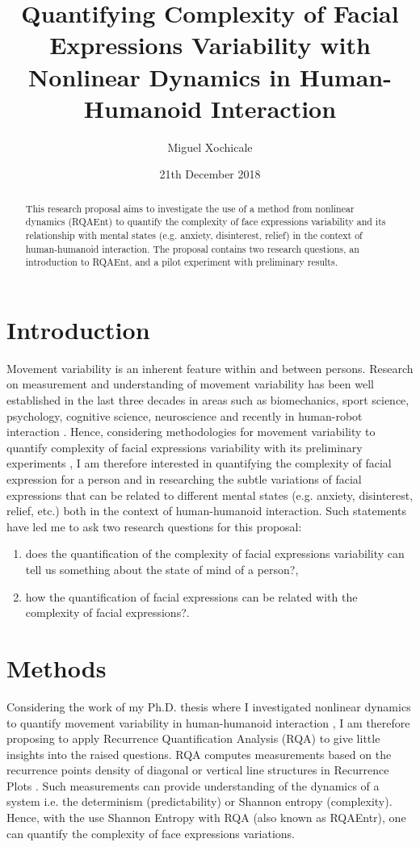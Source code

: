 \documentclass[12pt]{article}
\title{Quantifying Complexity of Facial Expressions 
Variability with Nonlinear Dynamics
in Human-Humanoid Interaction}
\author{Miguel Xochicale\\ 
}
\date{21th December 2018}
\begin{document}
\maketitle


\begin{abstract}
This research proposal aims to investigate the use of a method from nonlinear dynamics 
(RQAEnt) to quantify the complexity of face expressions variability and 
its relationship with mental states (e.g. anxiety, disinterest, relief)
in the context of human-humanoid interaction. 
The proposal contains two research questions,
an introduction to RQAEnt, and a pilot experiment with preliminary results.
\end{abstract}


\section{Introduction}
Movement variability is an inherent feature within and between persons. 
Research on measurement and understanding of movement variability has been 
well established in the last three decades in areas such as biomechanics, 
sport science, psychology, cognitive science, neuroscience and recently
in human-robot interaction \cite{2018arXiv181009249X}.
Hence, considering methodologies for movement variability 
to quantify complexity of facial expressions variability 
with its preliminary experiments \cite{MPXochicale_CERE2018},
I am therefore interested in quantifying the complexity 
of facial expression for a person and in researching 
the subtle variations of facial expressions that can be related to different 
mental states (e.g. anxiety, disinterest, relief, etc.)  \cite{back2014}
both in the context of human-humanoid interaction.
Such statements have led me to ask two research questions for this
proposal: 
\begin{enumerate}[label=(\roman*)]
 \item does the quantification of the complexity of facial expressions 
	variability can tell us something about the state of mind of a person?, 
\item how the quantification of facial expressions can be related with 
the complexity of facial expressions?.
\end{enumerate}

\section{Methods}
Considering the work of my Ph.D. thesis where I investigated nonlinear dynamics
to quantify movement variability in 
human-humanoid interaction \cite{XochicalePhDThesis2018},
I am therefore proposing to apply Recurrence Quantification Analysis (RQA) to
give little insights into the raised questions.
RQA computes measurements based on the recurrence points density of diagonal 
or vertical line structures in Recurrence Plots \cite{marwan2007}. 
Such measurements can provide understanding of the dynamics of a system 
i.e. the determinism (predictability) or Shannon entropy (complexity).
Hence, with the use Shannon Entropy with RQA (also known as RQAEntr),
one can quantify the complexity of face expressions variations. 
\end{document}
